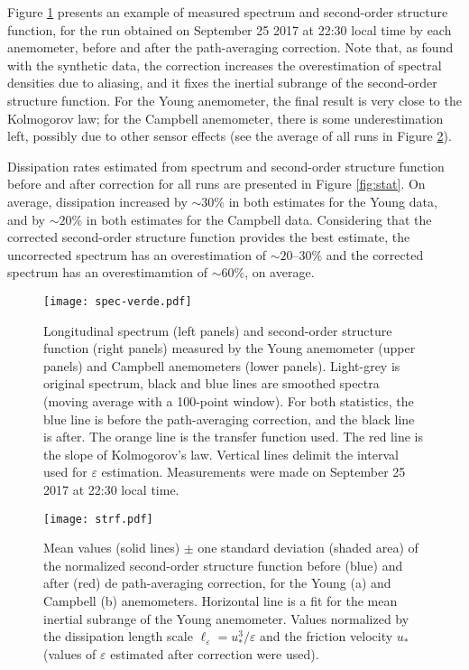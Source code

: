 \documentclass{svjour3}                     %
\begin{document}
Figure \ref{fig:specfield} presents an example of measured spectrum
and second-order structure function, for the run obtained on September
25 2017 at 22:30 local time by each anemometer, before and after the
path-averaging correction. Note that, as found with the synthetic
data, the correction increases the overestimation of spectral
densities due to aliasing, and it fixes the inertial subrange of the
second-order structure function. For the Young anemometer, the final
result is very close to the Kolmogorov law; for the Campbell
anemometer, there is some underestimation left, possibly due to other
sensor effects (see the average of all runs in Figure
\ref{fig:strf}).

Dissipation rates estimated from spectrum and second-order structure
function before and after correction for all runs are presented in
Figure \ref{fig:stat}. On average, dissipation increased by $\sim30\%$
in both estimates for the Young data, and by $\sim20\%$ in both
estimates for the Campbell data. Considering that the corrected
second-order structure function provides the best estimate, the
uncorrected spectrum has an overestimation of $\sim 20$--$30\%$ and the
corrected spectrum has an overestimamtion of $\sim 60\%$, on average.

\begin{figure}\centering
  \texttt{[image: spec-verde.pdf]}
  \caption{Longitudinal spectrum (left panels) and second-order
    structure function (right panels) measured by the Young anemometer
    (upper panels) and Campbell anemometers (lower panels). Light-grey
    is original spectrum, black and blue lines are smoothed spectra
    (moving average with a 100-point window). For both statistics, the
    blue line is before the path-averaging correction, and the black
    line is after. The orange line is the transfer function used. The
    red line is the slope of Kolmogorov's law. Vertical lines
    delimit the interval used for $\varepsilon$
    estimation. Measurements were made on September 25 2017 at 22:30
    local time. \label{fig:specfield}}
\end{figure}

\begin{figure}\centering
  \texttt{[image: strf.pdf]}
  \caption{Mean values (solid lines) $\pm$ one standard deviation (shaded area)
    of the normalized second-order structure function before (blue) and after
    (red) de path-averaging correction, for the Young (a) and Campbell (b)
    anemometers. Horizontal line is a fit for the mean inertial subrange of the
    Young anemometer. Values normalized by the dissipation length scale
    $\ell_\varepsilon = u_*^3/\varepsilon$ and the friction velocity $u_*$
    (values of $\varepsilon$ estimated after correction were
    used).  \label{fig:strf}}
\end{figure}
\end{document}
